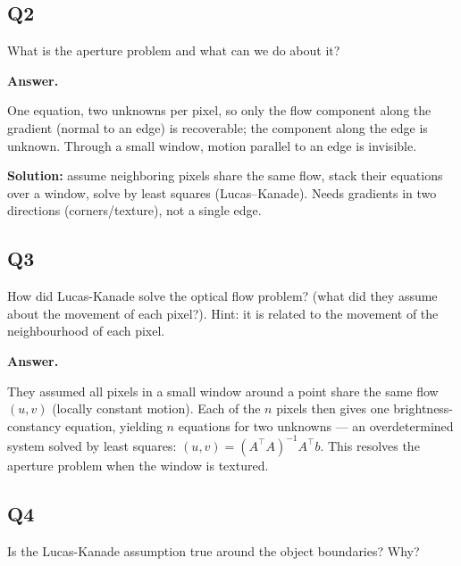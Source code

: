 \documentclass[11pt]{article}
\begin{document}
\subsection*{Q2}

What is the aperture problem and what can we do about it?

\medskip
\noindent\textbf{Answer.}

\medskip
\noindent
One equation, two unknowns per pixel, so only the flow component along the gradient
(normal to an edge) is recoverable; the component along the edge is unknown. Through a
small window, motion parallel to an edge is invisible.

\medskip
\noindent\textbf{Solution:} assume neighboring pixels share the same flow, stack their
equations over a window, solve by least squares (Lucas--Kanade). Needs gradients in two
directions (corners/texture), not a single edge.


\subsection*{Q3}

How did Lucas-Kanade solve the optical flow problem? (what did they assume about the movement of each pixel?). Hint: it is related to the movement of the neighbourhood of each pixel.

\medskip
\noindent\textbf{Answer.}

\medskip
\noindent
They assumed all pixels in a small window around a point share the same flow $(u,v)$
(locally constant motion). Each of the $n$ pixels then gives one brightness-constancy
equation, yielding $n$ equations for two unknowns --- an overdetermined system solved
by least squares: $(u,v) = (A^\top A)^{-1} A^\top b$. This resolves the aperture
problem when the window is textured.


\subsection*{Q4}

Is the Lucas-Kanade assumption true around the object boundaries? Why?
\end{document}
